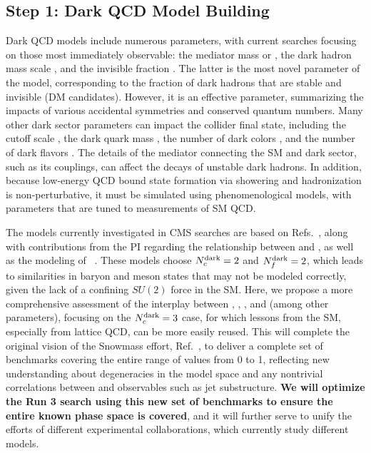 \subsection{Step 1: Dark QCD Model Building}\label{subsec:models}

Dark QCD models include numerous parameters, with current searches focusing on those most immediately observable:
the mediator mass \mZprime or \mbifun, the dark hadron mass scale \mdark, and the invisible fraction \rinv.
The latter is the most novel parameter of the model, corresponding to the fraction of dark hadrons that are stable and invisible (DM candidates).
However, it is an effective parameter, summarizing the impacts of various accidental symmetries and conserved quantum numbers.
Many other dark sector parameters can impact the collider final state, including the cutoff scale \Lamdark, the dark quark mass \mqdark, the number of dark colors \Ncdark, and the number of dark flavors \Nfdark.
The details of the mediator connecting the SM and dark sector, such as its couplings, can affect the decays of unstable dark hadrons.
In addition, because low-energy QCD bound state formation via showering and hadronization is non-perturbative, it must be simulated using phenomenological models,
with parameters that are tuned to measurements of SM QCD.

The models currently investigated in CMS searches are based on Refs.~\cite{Cohen:2015toa,Cohen:2017pzm}, along with contributions from the PI
regarding the relationship between \mdark and \Lamdark, as well as the modeling of \rinv~\cite{Albouy:2022cin}.
These models choose $N_{c}^{\text{dark}}=2$ and $N_{f}^{\text{dark}}=2$, which leads to similarities in baryon and meson states that may not be modeled correctly,
given the lack of a confining $SU(2)$ force in the SM.
Here, we propose a more comprehensive assessment of the interplay between \Nfdark, \Lamdark, \mdark, and \mqdark (among other parameters),
focusing on the $N_{c}^{\text{dark}}=3$ case, for which lessons from the SM, especially from lattice QCD, can be more easily reused.
This will complete the original vision of the Snowmass effort, Ref.~\cite{Albouy:2022cin},
to deliver a complete set of benchmarks covering the entire range of \rinv values from 0 to 1,
reflecting new understanding about degeneracies in the model space and any nontrivial correlations between \rinv and observables such as jet substructure.
\textbf{We will optimize the Run 3 search using this new set of benchmarks to ensure the entire known phase space is covered},
and it will further serve to unify the efforts of different experimental collaborations, which currently study different models.

